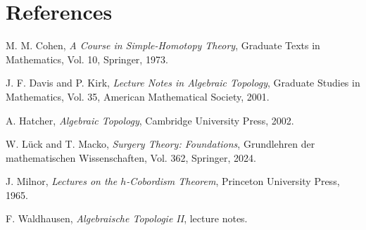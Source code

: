 \documentclass[11pt,a4paper]{article}
\theoremstyle{definition}
\theoremstyle{plain}
\theoremstyle{remark}
\begin{document}
\section*{References}

\begin{enumerate}[label={[\arabic*]}]
  \item M. M. Cohen, \emph{A Course in Simple-Homotopy Theory}, Graduate Texts in Mathematics, Vol. 10, Springer, 1973.
  \item J. F. Davis and P. Kirk, \emph{Lecture Notes in Algebraic Topology}, Graduate Studies in Mathematics, Vol. 35, American Mathematical Society, 2001.
  \item A. Hatcher, \emph{Algebraic Topology}, Cambridge University Press, 2002.
  \item W. L\"uck and T. Macko, \emph{Surgery Theory: Foundations}, Grundlehren der mathematischen Wissenschaften, Vol. 362, Springer, 2024.
  \item J. Milnor, \emph{Lectures on the \(h\)-Cobordism Theorem}, Princeton University Press, 1965.
  \item F. Waldhausen, \emph{Algebraische Topologie II}, lecture notes.
\end{enumerate}
\end{document}
